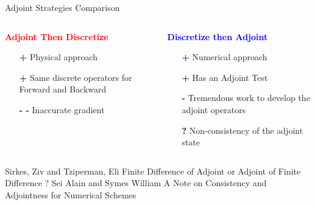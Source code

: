 
\begin{frame}{Adjoint Strategies Comparison}
  \begin{columns}
    \begin{column}[t]{0.5\textwidth}
      \textbf{\textcolor{red}{Adjoint Then Discretize}}
      \vspace{0.5cm}
      \begin{itemize}
      \item[\textcolor{\mygreen}{\textbf{+}}] Physical approach
      \item[\textcolor{\mygreen}{\textbf{+}}] Same discrete operators for Forward and Backward
      \item[\textbf{- -}] Inaccurate gradient \cite{Sirkes}
      \end{itemize}
      \vspace{0.5cm}
    \end{column}\vrule \hfill
    \begin{column}[t]{0.5\textwidth}
      \textbf{\textcolor{blue}{Discretize then Adjoint}}
      \vspace{0.5cm}
      \begin{itemize}
      \item[\textcolor{\mygreen}{\textbf{+}}] Numerical approach
      \item[\textcolor{\mygreen}{\textbf{+}}] Has an Adjoint Test
      \item[\textbf{-}] Tremendous work to develop the adjoint operators
      \item[\textcolor{black}{\textbf{?}}] Non-consistency of the adjoint state \cite{Set1997Feb}
      \end{itemize}
    \end{column}
  \end{columns}

  \vfill
  \tiny
  \begin{thebibliography}{2}
     Sirkes, Ziv and Tziperman, Eli
      \newblock Finite Difference of Adjoint or Adjoint of Finite Difference ?
   Sei Alain and Symes William
    \newblock A Note on Consistency and Adjointness for Numerical Schemes
  \end{thebibliography}

\end{frame}
